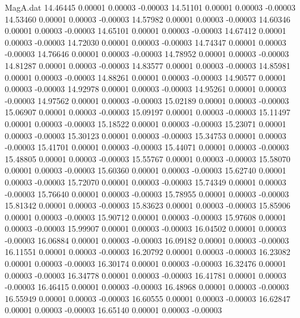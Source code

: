 \begin{filecontents}{MagA.dat}
  14.46445    0.00001    0.00003   -0.00003
  14.51101    0.00001    0.00003   -0.00003
  14.53460    0.00001    0.00003   -0.00003
  14.57982    0.00001    0.00003   -0.00003
  14.60346    0.00001    0.00003   -0.00003
  14.65101    0.00001    0.00003   -0.00003
  14.67412    0.00001    0.00003   -0.00003
  14.72030    0.00001    0.00003   -0.00003
  14.74347    0.00001    0.00003   -0.00003
  14.76646    0.00001    0.00003   -0.00003
  14.78952    0.00001    0.00003   -0.00003
  14.81287    0.00001    0.00003   -0.00003
  14.83577    0.00001    0.00003   -0.00003
  14.85981    0.00001    0.00003   -0.00003
  14.88261    0.00001    0.00003   -0.00003
  14.90577    0.00001    0.00003   -0.00003
  14.92978    0.00001    0.00003   -0.00003
  14.95261    0.00001    0.00003   -0.00003
  14.97562    0.00001    0.00003   -0.00003
  15.02189    0.00001    0.00003   -0.00003
  15.06907    0.00001    0.00003   -0.00003
  15.09197    0.00001    0.00003   -0.00003
  15.11497    0.00001    0.00003   -0.00003
  15.18522    0.00001    0.00003   -0.00003
  15.23071    0.00001    0.00003   -0.00003
  15.30123    0.00001    0.00003   -0.00003
  15.34753    0.00001    0.00003   -0.00003
  15.41701    0.00001    0.00003   -0.00003
  15.44071    0.00001    0.00003   -0.00003
  15.48805    0.00001    0.00003   -0.00003
  15.55767    0.00001    0.00003   -0.00003
  15.58070    0.00001    0.00003   -0.00003
  15.60360    0.00001    0.00003   -0.00003
  15.62740    0.00001    0.00003   -0.00003
  15.72070    0.00001    0.00003   -0.00003
  15.74349    0.00001    0.00003   -0.00003
  15.76640    0.00001    0.00003   -0.00003
  15.78955    0.00001    0.00003   -0.00003
  15.81342    0.00001    0.00003   -0.00003
  15.83623    0.00001    0.00003   -0.00003
  15.85906    0.00001    0.00003   -0.00003
  15.90712    0.00001    0.00003   -0.00003
  15.97608    0.00001    0.00003   -0.00003
  15.99907    0.00001    0.00003   -0.00003
  16.04502    0.00001    0.00003   -0.00003
  16.06884    0.00001    0.00003   -0.00003
  16.09182    0.00001    0.00003   -0.00003
  16.11551    0.00001    0.00003   -0.00003
  16.20792    0.00001    0.00003   -0.00003
  16.23082    0.00001    0.00003   -0.00003
  16.30174    0.00001    0.00003   -0.00003
  16.32476    0.00001    0.00003   -0.00003
  16.34778    0.00001    0.00003   -0.00003
  16.41781    0.00001    0.00003   -0.00003
  16.46415    0.00001    0.00003   -0.00003
  16.48968    0.00001    0.00003   -0.00003
  16.55949    0.00001    0.00003   -0.00003
  16.60555    0.00001    0.00003   -0.00003
  16.62847    0.00001    0.00003   -0.00003
  16.65140    0.00001    0.00003   -0.00003

\end{filecontents}
